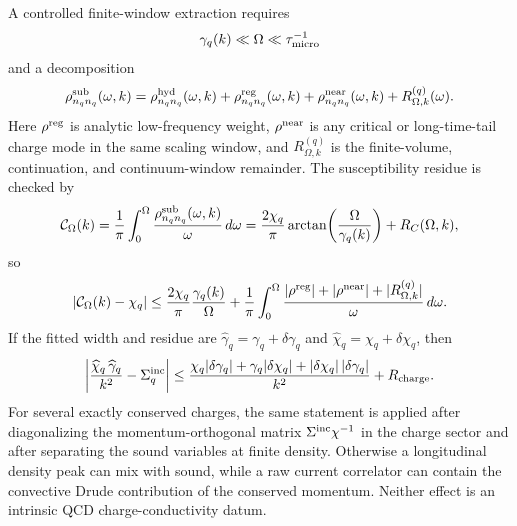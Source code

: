 \begin{controlledapproximation}
A controlled finite-window extraction requires
\begin{equation}
  \gamma_q(k)\ll\Omega\ll \tau_{\rm micro}^{-1}
  \label{eq:qcd-charge-diffusion-window-scale-separation}
\end{equation}
and a decomposition
\begin{equation}
  \rho^{\rm sub}_{n_qn_q}(\omega,k)
  =
  \rho^{\rm hyd}_{n_qn_q}(\omega,k)
  +
  \rho^{\rm reg}_{n_qn_q}(\omega,k)
  +
  \rho^{\rm near}_{n_qn_q}(\omega,k)
  +
  R^{(q)}_{\Omega,k}(\omega).
  \label{eq:qcd-charge-diffusion-window-decomposition}
\end{equation}
Here \(\rho^{\rm reg}\) is analytic low-frequency weight,
\(\rho^{\rm near}\) is any critical or long-time-tail charge mode in the same
scaling window, and \(R^{(q)}_{\Omega,k}\) is the finite-volume,
continuation, and continuum-window remainder.  The susceptibility residue is
checked by
\begin{equation}
  \mathcal C_\Omega(k)
  =
  \frac1\pi\int_0^\Omega
  \frac{\rho^{\rm sub}_{n_qn_q}(\omega,k)}{\omega}\,d\omega
  =
  \frac{2\chi_q}{\pi}
  \arctan\!\left(\frac{\Omega}{\gamma_q(k)}\right)
  +
  R_C(\Omega,k),
  \label{eq:qcd-charge-diffusion-window-area}
\end{equation}
so
\begin{equation}
  \left|\mathcal C_\Omega(k)-\chi_q\right|
  \le
  \frac{2\chi_q}{\pi}\frac{\gamma_q(k)}{\Omega}
  +
  \frac1\pi\int_0^\Omega
  \frac{|\rho^{\rm reg}|+|\rho^{\rm near}|+|R^{(q)}_{\Omega,k}|}{\omega}\,
  d\omega .
  \label{eq:qcd-charge-diffusion-residue-bound}
\end{equation}
If the fitted width and residue are
\(\widehat\gamma_q=\gamma_q+\delta\gamma_q\) and
\(\widehat\chi_q=\chi_q+\delta\chi_q\), then
\begin{equation}
  \left|
  \frac{\widehat\chi_q\,\widehat\gamma_q}{k^2}
  -
  \Sigma_q^{\rm inc}
  \right|
  \le
  \frac{
    \chi_q|\delta\gamma_q|
    +
    \gamma_q|\delta\chi_q|
    +
    |\delta\chi_q|\,|\delta\gamma_q|
  }{k^2}
  +
  R_{\rm charge}.
  \label{eq:qcd-charge-diffusion-conductivity-budget}
\end{equation}
For several exactly conserved charges, the same statement is applied after
diagonalizing the momentum-orthogonal matrix
\(\Sigma^{\rm inc}\chi^{-1}\) in the charge sector and after separating the
sound variables at finite density.  Otherwise a longitudinal density peak can
mix with sound, while a raw current correlator can contain the convective
Drude contribution of the conserved momentum.  Neither effect is an intrinsic
QCD charge-conductivity datum.
\end{controlledapproximation}


